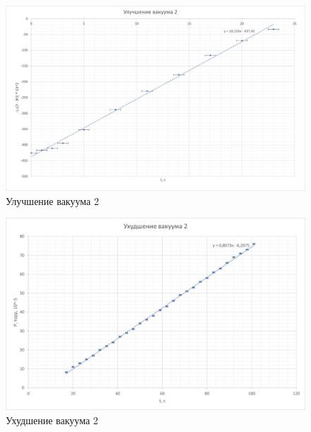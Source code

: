 \documentclass[11pt,a4paper]{article}
\begin{document}
	\centering
	\begin{figure}[h!]
		\includegraphics[scale=1.6]{IncreaseVacuum2}
		\caption{Улучшение вакуума 2}
		\label{graph3}
	\end{figure}
	
	\begin{figure}[h!]
		\includegraphics[scale=1.6]{DecreaseVacuum2}
		\caption{Ухудшение вакуума 2}
		\label{graph4}
	\end{figure}
	
\end{document}
